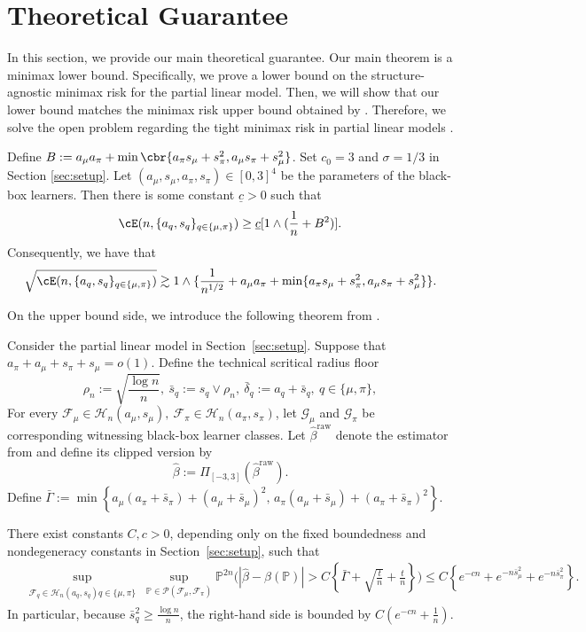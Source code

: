 \documentclass[11pt]{article}
\begin{document}
\iffalse
\section{Theoretical Guarantee}\label{sec:thms}
In this section, we provide our main theoretical guarantee. Our main theorem is a minimax lower bound. Specifically, we prove a lower bound on the structure-agnostic minimax risk for the partial linear model. Then, we will show that our lower bound matches the minimax risk upper bound obtained by \citet{gu2026optimal}. Therefore, we solve the open problem regarding the tight minimax risk in partial linear models \citep{gu2025open}.
\begin{theorem}\label{thm:lower_bound}
    Define $B:=a_{\mu}a_\pi+\min\cbr{a_{\pi}s_\mu+s_\pi^2,a_\mu s_\pi+s_\mu^2}$. Set $c_0=3$ and $\sigma=1/3$ in Section \ref{sec:setup}. Let $(a_\mu,s_\mu,a_\pi,s_\pi)\in[0,3]^4$ be the parameters of the black-box learners. Then there is some constant $\underline{c}>0$ such that 
    \[
    \cE(n,\{a_q,s_q\}_{q\in\{\mu,\pi\}})\ge \underline{c}[1\wedge(\frac{1}{n}+B^2)].
    \]
    Consequently, we have that
    \[
    \sqrt{ \cE(n,\{a_q,s_q\}_{q\in\{\mu,\pi\}})}\gtrsim1\wedge\{\frac{1}{n^{1/2}}+a_\mu a_\pi+\min\{a_{\pi}s_\mu+s_\pi^2,a_\mu s_\pi+s_\mu^2\}\}.
    \]
\end{theorem}


On the upper bound side, we introduce the following theorem from \citet{gu2026optimal}.
\begin{theorem}
\label{thm:upper_bound}
Consider the partial linear model in Section~\ref{sec:setup}.
Suppose that $a_\pi+a_\mu+s_\pi+s_\mu=o(1)$.
Define the technical scritical radius floor
\[
\rho_n:=\sqrt{\frac{\log n}{n}},
\ 
\bar s_q:=s_q\vee\rho_n,
\ \bar\delta_q:=a_q+\bar s_q,\  q\in\{\mu,\pi\},
\]
For every $\mathcal F_\mu\in\mathcal H_n(a_\mu,s_\mu),
\ 
\mathcal F_\pi\in\mathcal H_n(a_\pi,s_\pi)$, let $\mathcal G_\mu$ and $\mathcal G_\pi$ be corresponding witnessing
black-box learner classes. Let $\widehat{\beta}^{\mathrm{raw}}$ denote the estimator from \citet{gu2026optimal} and define its clipped version by
\[
\widehat\beta
:=
\Pi_{[-3,3]}
\left(
\widehat\beta^{\mathrm{raw}}
\right).
\]
Define $\bar\Gamma
:=
\min\left\{
a_\mu(a_\pi+\bar s_\pi)+(a_\mu+\bar s_\mu)^2,\,
a_\pi(a_\mu+\bar s_\mu)+(a_\pi+\bar s_\pi)^2
\right\}$.

There exist constants $C,c>0$, depending only on the fixed boundedness
and nondegeneracy constants in Section~\ref{sec:setup}, such that
\begin{align*}
&
\sup_{\substack{
\mathcal F_q\in\mathcal H_n(a_q,s_q)q\in\{\mu,\pi\}
}}
\sup_{\mathbb P\in
\mathcal P(\mathcal F_\mu,\mathcal F_\pi)}
\mathbb P^{2n}
\Bigg(
\left|
\widehat\beta
-\beta(\mathbb P)
\right|>
C\left\{
\bar\Gamma
+\sqrt{\frac tn}
+\frac tn
\right\}
\Bigg)\le
C\left\{
e^{-cn}
+
e^{-n\bar s_\mu^2}
+
e^{-n\bar s_\pi^2}
\right\}.
\end{align*}
In particular, because $\bar s_q^2\ge\frac{\log n}{n}$, the right-hand side is bounded by $C\left(e^{-cn}+\frac1n\right)$.
\end{theorem}
\end{document}
